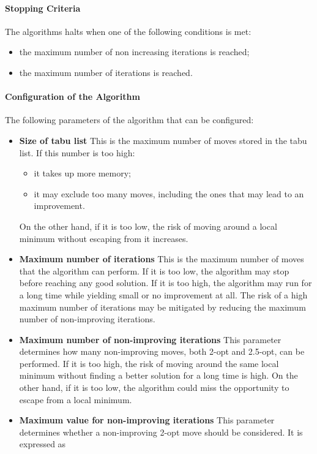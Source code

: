 \documentclass{article}
\begin{document}
\paragraph{Stopping Criteria}
The algorithms halts when one of the following conditions is met:
\begin{itemize}
    \item the maximum number of non increasing iterations is reached;
    \item the maximum number of iterations is reached.
\end{itemize}

\paragraph{Configuration of the Algorithm}
The following parameters of the algorithm that can be configured:
\begin{itemize}
    \item \textbf{Size of tabu list}
          This is the maximum number of moves stored in the tabu list.
          If this number is too high:
          \begin{itemize}
              \item it takes up more memory;
              \item it may exclude too many moves, including the ones that may lead to an improvement.
          \end{itemize}
          On the other hand, if it is too low, the risk of moving around a local minimum without escaping from it increases.

    \item \textbf{Maximum number of iterations}
          This is the maximum number of moves that the algorithm can perform.
          If it is too low, the algorithm may stop before reaching any good solution.
          If it is too high, the algorithm may run for a long time while yielding small or no improvement at all.
          The risk of a high maximum number of iterations may be mitigated by reducing the maximum number of non-improving iterations.

    \item \textbf{Maximum number of non-improving iterations}
          This parameter determines how many non-improving moves, both 2-opt and 2.5-opt, can be performed.
          If it is too high, the risk of moving around the same local minimum without finding a better solution for a long time is high.
          On the other hand, if it is too low, the algorithm could miss the opportunity to escape from a local minimum.

    \item \textbf{Maximum value for non-improving iterations}
          This parameter determines whether a non-improving 2-opt move should be considered.
          It is expressed as

\end{itemize}
\end{document}
